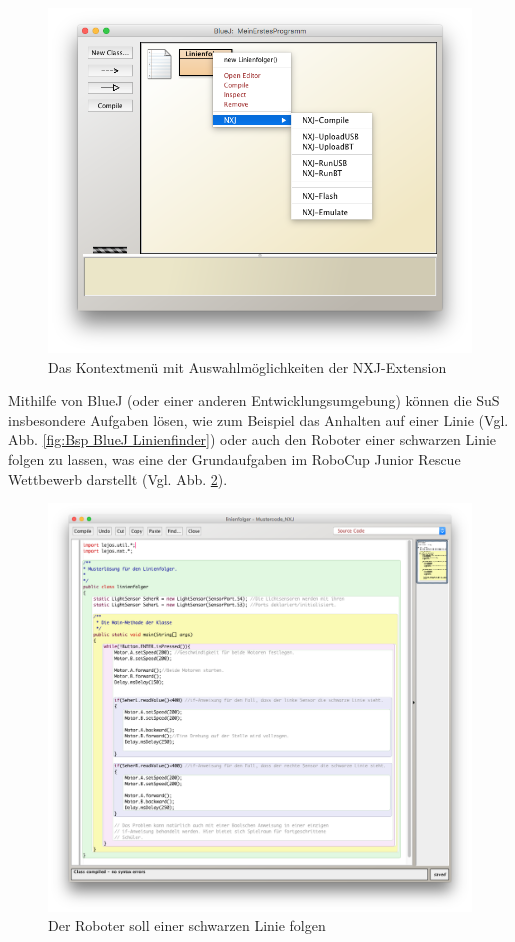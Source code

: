 \documentclass[paper=a4, pagesize, DIV=calc, BCOR=15mm, twoside=on, onecolumn=on, open = right, titlepage =on, parskip =half-, headsepline = on, footsepline = on, chapterprefix = on, appendixprefix = off, fontsize = 12pt, numbers = noenddot, abstract = on]{scrbook}
\numberwithin{equation}{chapter}
\theoremstyle{definition}
\theoremstyle{plain}
\theoremstyle{plain}
\theoremstyle{remark}
\theoremstyle{plain}
\theoremstyle{plain}
\begin{document}
\begin{figure}[htbp]
\centering
\includegraphics[scale=0.4]{images/extension.png}
\caption{Das Kontextmenü mit Auswahlmöglichkeiten der NXJ-Extension}
\label{fig:extension}
\end{figure}

Mithilfe von BlueJ (oder einer anderen Entwicklungsumgebung) können die SuS insbesondere Aufgaben lösen, wie zum Beispiel das Anhalten auf einer Linie (Vgl. Abb. \ref{fig:Bsp BlueJ Linienfinder}) oder auch den Roboter einer schwarzen Linie folgen zu lassen, was eine der Grundaufgaben im RoboCup Junior Rescue Wettbewerb darstellt (Vgl. Abb. \ref{fig:Bsp BlueJ Linienfolger}).

\begin{figure}[htbp]
\centering
\includegraphics[scale=0.35]{images/linienfolger_bluej.png} 
\caption{Der Roboter soll einer schwarzen Linie folgen}
\label{fig:Bsp BlueJ Linienfolger}
\end{figure} 
\end{document}
